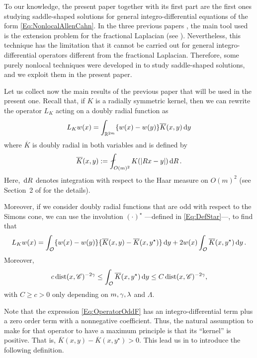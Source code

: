 To our knowledge, the present paper together with its first part \cite{FelipeSanz-Perela:IntegroDifferentialI} are the first ones studying saddle-shaped solutions for general integro-differential equations of the form \eqref{Eq:NonlocalAllenCahn}. In the three previous papers \cite{Cinti-Saddle, Cinti-Saddle2, Felipe-Sanz-Perela:SaddleFractional}, the main tool used is the extension problem for the fractional Laplacian (see \cite{CaffarelliSilvestre}). Nevertheless, this technique has the limitation that it cannot be carried out for general integro-differential operators different from the fractional Laplacian. Therefore, some purely nonlocal techniques were developed in \cite{FelipeSanz-Perela:IntegroDifferentialI} to study saddle-shaped solutions, and we exploit them in the present paper.


Let us collect now the main results of the previous paper \cite{FelipeSanz-Perela:IntegroDifferentialI} that will be used in the present one. Recall that, if $K$ is a radially symmetric kernel, then we can rewrite the operator $L_K$ acting on a doubly radial function as
$$
L_K w(x) = \int_{\mathbb{R}^{2m}} \{w(x) - w(y)\} \overline{K}(x,y) \,\mathrm{d} y
$$
where $\overline{K}$ is doubly radial in both variables and is defined by
\begin{equation}
\label{Eq:KbarDef}
\overline{K}(x,y) := \average_{O(m)^2} K(|Rx - y|)\d R\,.
\end{equation}
Here, $\,\mathrm{d} R$ denotes integration with respect to the Haar measure on $O(m)^2$ (see Section~2 of \cite{FelipeSanz-Perela:IntegroDifferentialI} for the details).

Moreover, if we consider doubly radial functions that are odd with respect to the Simons cone, we can use the involution $(\cdot)^\star$ ---defined in \eqref{Eq:DefStar}---, to find that
\begin{equation}
\label{Eq:OperatorOddF}
L_K w (x) = \int_{\mathcal{O}} \{w(x) - w(y) \} \{\overline{K}(x, y) - \overline{K}(x, y^\star)  \} \,\mathrm{d} y +  2 w(x) \int_{\mathcal{O}} \overline{K}(x, y^\star) \,\mathrm{d} y \,.
\end{equation}
Moreover,
\begin{equation}
\label{Eq:ZeroOrderTerm}
c \operatorname{dist}(x,\mathscr{C})^{-2\gamma} \leq \int_{\mathcal{O}} \overline{K}(x, y^\star) \,\mathrm{d} y \leq C \operatorname{dist}(x,\mathscr{C})^{-2\gamma},
\end{equation}
with $C\geq c>0$ only depending on $m, \gamma, \lambda$ and $\Lambda$.


Note that the expression \eqref{Eq:OperatorOddF} has an integro-differential term plus a zero order term with a nonnegative coefficient. Thus, the natural assumption to make for that operator to have a maximum principle is that its ``kernel'' is positive. That is, $\overline{K}(x, y) - \overline{K}(x, y^\star)>0$. This lead us in \cite{FelipeSanz-Perela:IntegroDifferentialI} to introduce the following definition.

